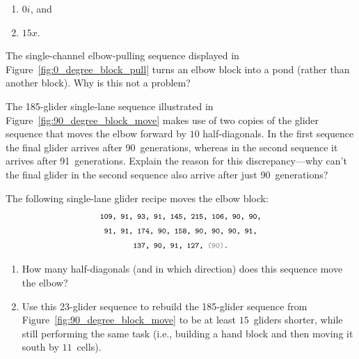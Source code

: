\begin{multicols}{2}
\begin{problem}
\begin{enumerate}[label=\bf\color{ocre}(\alph*)]
			\item $0i$, and
			
			\item $15x$.
		\end{enumerate}
	\end{problem}
	
	
	\mfilbreak
	
	
	\begin{problem}\label{exer:block_pull_pond} 
		The single-channel elbow-pulling sequence displayed in Figure~\ref{fig:0_degree_block_pull} turns an elbow block into a pond (rather than another block). Why is this not a problem?
	\end{problem}
	
	
	\mfilbreak
	
	
	\begin{problemstar}\label{exer:single_lane_glider_final_glider_explain} 
		The 185-glider single-lane sequence illustrated in Figure~\ref{fig:90_degree_block_move} makes use of two copies of the glider sequence that moves the elbow forward by $10$ half-diagonals. In the first sequence the final glider arrives after 90~generations, whereas in the second sequence it arrives after 91~generations. Explain the reason for this discrepancy---why can't the final glider in the second sequence also arrive after just 90~generations?
	\end{problemstar}
	
	
	\mfilbreak
	
	
	\begin{problem}\label{exer:push_elbow_longer} 
		The following single-lane glider recipe moves the elbow block:
		\begin{align*}
		& \text{\texttt{\footnotesize 109, 91, 93, 91, 145, 215, 106, 90, 90,}} \\
		& \text{\texttt{\footnotesize~91, 91, 174, 90, 158, 90, 90, 90, 91,}} \\
		& \text{\texttt{\footnotesize~~~~~~~~137, 90, 91, 127, {\color{gray}(90)}.}}
		\end{align*}
		
		\begin{enumerate}[label=\bf\color{ocre}(\alph*)]
			\item How many half-diagonals (and in which direction) does this sequence move the elbow?
			
			\item Use this 23-glider sequence to rebuild the 185-glider sequence from Figure~\ref{fig:90_degree_block_move} to be at least $15$~gliders shorter, while still performing the same task (i.e., building a hand block and then moving it south by $11$~cells).
		\end{enumerate}
	\end{problem}
	

\end{multicols}
